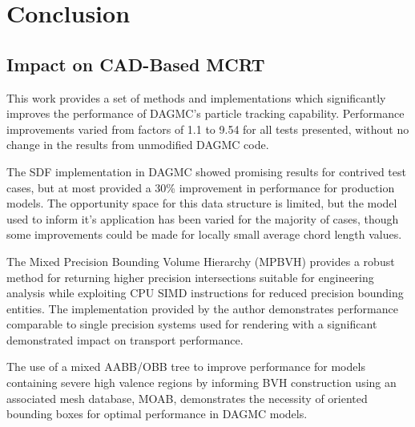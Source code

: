 
\chapter{Conclusion}\label{ch:conclusion}

\section{Impact on CAD-Based MCRT}

This work provides a set of methods and implementations which significantly
improves the performance of DAGMC's particle tracking
capability. Performance improvements varied from factors of 1.1 to
9.54 for all tests presented, without no change in the results from
unmodified DAGMC code. 

The SDF implementation in DAGMC showed promising results for contrived test
cases, but at most provided a 30\% improvement in performance for production
models. The opportunity space for this data structure is limited, but the model
used to inform it's application has been varied for the majority of cases,
though some improvements could be made for locally small average chord length
values.

The Mixed Precision Bounding Volume Hierarchy (MPBVH) provides a robust method
for returning higher precision intersections suitable for engineering analysis
while exploiting CPU SIMD instructions for reduced precision bounding
entities. The implementation provided by the author demonstrates performance
comparable to single precision systems used for rendering with a significant
demonstrated impact on transport performance.

The use of a mixed AABB/OBB tree to improve performance for models containing
severe high valence regions by informing BVH construction using an associated
mesh database, MOAB, demonstrates the necessity of oriented bounding boxes for
optimal performance in DAGMC models.

